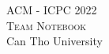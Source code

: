 \documentclass[a4paper, landscape, 9pt]{article}
\begin{document}
\begin{center}
\Huge\textsc{ACM - ICPC 2022} \\
\Huge\textsc{Team Notebook} \\
\huge Can Tho University
\end{center}

\begin{multicols*}{2}
\tableofcontents
\pagebreak


\end{multicols*}
\end{document}
